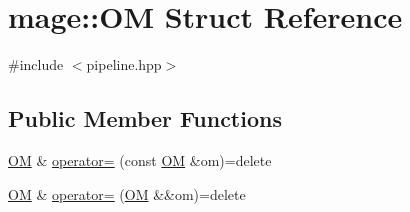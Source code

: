 \hypertarget{structmage_1_1_o_m}{}\section{mage\+:\+:OM Struct Reference}
\label{structmage_1_1_o_m}


{\ttfamily \#include $<$pipeline.\+hpp$>$}

\subsection*{Public Member Functions}
\begin{DoxyCompactItemize}
\item 
\hyperlink{structmage_1_1_o_m}{OM} \& \hyperlink{structmage_1_1_o_m_a5723e41c14ddef69d5df24932beba1f4}{operator=} (const \hyperlink{structmage_1_1_o_m}{OM} \&om)=delete
\item 
\hyperlink{structmage_1_1_o_m}{OM} \& \hyperlink{structmage_1_1_o_m_aef1ed26f848f0bf57b4e92cddd7ad8e5}{operator=} (\hyperlink{structmage_1_1_o_m}{OM} \&\&om)=delete
\end{DoxyCompactItemize}
